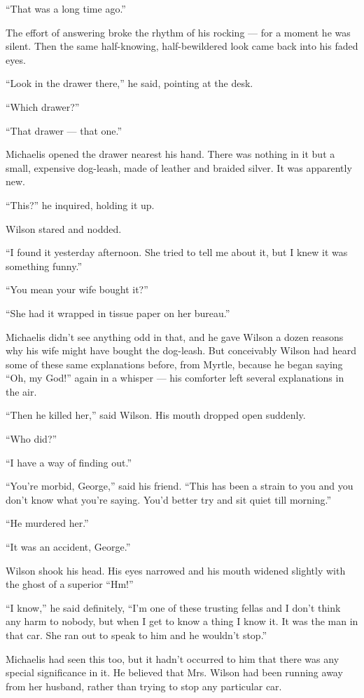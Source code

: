 \documentclass{znotebook}
\begin{document}
``That was a long time ago.''

The effort of answering broke the rhythm of his rocking ---{} for a moment he was silent. Then the same half-knowing, half-bewildered look came back into his faded eyes.

``Look in the drawer there,'' he said, pointing at the desk.

``Which drawer?''

``That drawer ---{} that one.''

Michaelis opened the drawer nearest his hand. There was nothing in it but a small, expensive dog-leash, made of leather and braided silver. It was apparently new.

``This?'' he inquired, holding it up.

Wilson stared and nodded.

``I found it yesterday afternoon. She tried to tell me about it, but I knew it was something funny.''

``You mean your wife bought it?''

``She had it wrapped in tissue paper on her bureau.''

Michaelis didn't see anything odd in that, and he gave Wilson a dozen reasons why his wife might have bought the dog-leash. But conceivably Wilson had heard some of these same explanations before, from Myrtle, because he began saying ``Oh, my God!'' again in a whisper ---{} his comforter left several explanations in the air.

``Then he killed her,'' said Wilson. His mouth dropped open suddenly.

``Who did?''

``I have a way of finding out.''

``You're morbid, George,'' said his friend. ``This has been a strain to you and you don't know what you're saying. You'd better try and sit quiet till morning.''

``He murdered her.''

``It was an accident, George.''

Wilson shook his head. His eyes narrowed and his mouth widened slightly with the ghost of a superior ``Hm!''

``I know,'' he said definitely, ``I'm one of these trusting fellas and I don't think any harm to nobody, but when I get to know a thing I know it. It was the man in that car. She ran out to speak to him and he wouldn't stop.''

Michaelis had seen this too, but it hadn't occurred to him that there was any special significance in it. He believed that Mrs. Wilson had been running away from her husband, rather than trying to stop any particular car.
\end{document}
